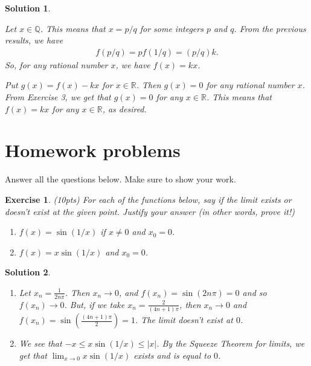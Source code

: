 \documentclass[12pt]{article}
\newcommand{\bR}{\mathbb{R}}
\newcommand{\bQ}{\mathbb{Q}}
\newcommand{\ra}{\rightarrow}
\theoremstyle{plain}
\newtheorem{exer}{\textbf{Exercise}}}
\theoremstyle{plain}
\newtheorem*{sol}{\textbf{Solution}}}
\theoremstyle{plain}
\theoremstyle{plain}
\begin{document}
\begin{sol}
\begin{enumerate}[label=\textbf{\alph*)}]
Let $x \in \bQ$. This means that $x = p/q$ for some integers $p$ and $q$. From the previous results, we have
	\begin{align*}
	f(p/q) = p f(1/q) = (p/q) k .
	\end{align*}
So, for any rational number $x$, we have $f(x) = kx$. 

Put $g(x) = f(x) - kx$ for $x \in \bR$. Then $g(x) = 0$ for any rational number $x$. From Exercise 3, we get that $g (x) = 0$ for any $x \in \bR$. This means that $f(x) = kx$ for any $x \in \bR$, as desired.
\end{enumerate}
\end{sol}



\section{Homework problems}
Answer all the questions below. Make sure to show your work.

\begin{exer}
(10pts)
For each of the functions below, say if the limit exists or doesn't exist at the given point. Justify your answer (in other words, prove it!)
	\begin{enumerate}[label=\textbf{\alph*)}]
	\item $f(x) = \sin (1/x)$ if $x \neq 0$ and $x_0 = 0$.
	\item $f(x) = x \sin (1/x)$ and $x_0 = 0$.
	\end{enumerate}
\end{exer}
\begin{sol}
\begin{enumerate}[label=\textbf{\alph*)}]
\item Let $x_n = \frac{1}{2n\pi}$. Then $x_n \ra 0$, and $f(x_n) = \sin (2n\pi ) = 0$ and so $f(x_n) \ra 0$. But, if we take $x_n = \frac{2}{(4n + 1)\pi}$, then $x_n \ra 0$ and $f(x_n ) = \sin ( \frac{(4n + 1)\pi}{2}) = 1$. The limit doesn't exist at $0$. 
\item We see that $-x \leq x \sin (1/x ) \leq |x|$. By the Squeeze Theorem for limits, we get that $\lim_{x \ra 0} x \sin (1/x )$ exists and is equal to $0$.
\end{enumerate}
\end{sol}
\end{document}

